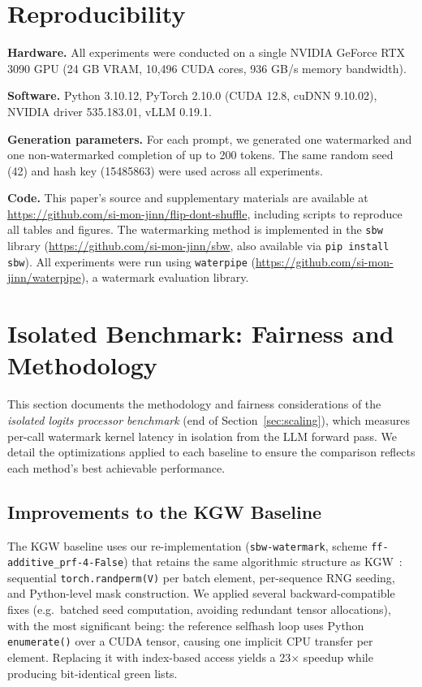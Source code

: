 \documentclass[11pt]{article}
\begin{document}
\section{Reproducibility}
\label{app:reproducibility}

\textbf{Hardware.} All experiments were conducted on a single NVIDIA GeForce RTX 3090 GPU (24 GB VRAM, 10,496 CUDA cores, 936 GB/s memory bandwidth).

\textbf{Software.} Python 3.10.12, PyTorch 2.10.0 (CUDA 12.8, cuDNN 9.10.02), NVIDIA driver 535.183.01, vLLM 0.19.1.

\textbf{Generation parameters.} For each prompt, we generated one watermarked and one non-watermarked completion of up to 200 tokens. The same random seed (42) and hash key (15485863) were used across all experiments.

\textbf{Code.} This paper's source and supplementary materials are available at \url{https://github.com/si-mon-jinn/flip-dont-shuffle}, including scripts to reproduce all tables and figures. The watermarking method is implemented in the \texttt{sbw} library (\url{https://github.com/si-mon-jinn/sbw}, also available via \texttt{pip install sbw}). All experiments were run using \texttt{waterpipe} (\url{https://github.com/si-mon-jinn/waterpipe}), a watermark evaluation library.

\section{Isolated Benchmark: Fairness and Methodology}
\label{app:fairness}

This section documents the methodology and fairness considerations of the \emph{isolated logits processor benchmark} (end of Section~\ref{sec:scaling}), which measures per-call watermark kernel latency in isolation from the LLM forward pass. We detail the optimizations applied to each baseline to ensure the comparison reflects each method's best achievable performance.

\subsection{Improvements to the KGW Baseline}

The KGW baseline uses our re-implementation (\texttt{sbw-watermark}, scheme \texttt{ff-additive\_prf-4-False}) that retains the same algorithmic structure as KGW~\cite{kirchenbauer2023watermark,kirchenbauer2024reliability}: sequential \texttt{torch.randperm(V)} per batch element, per-sequence RNG seeding, and Python-level mask construction. We applied several backward-compatible fixes (e.g.\ batched seed computation, avoiding redundant tensor allocations), with the most significant being: the reference selfhash loop uses Python \texttt{enumerate()} over a CUDA tensor, causing one implicit CPU transfer per element. Replacing it with index-based access yields a 23$\times$ speedup while producing bit-identical green lists.
\end{document}

